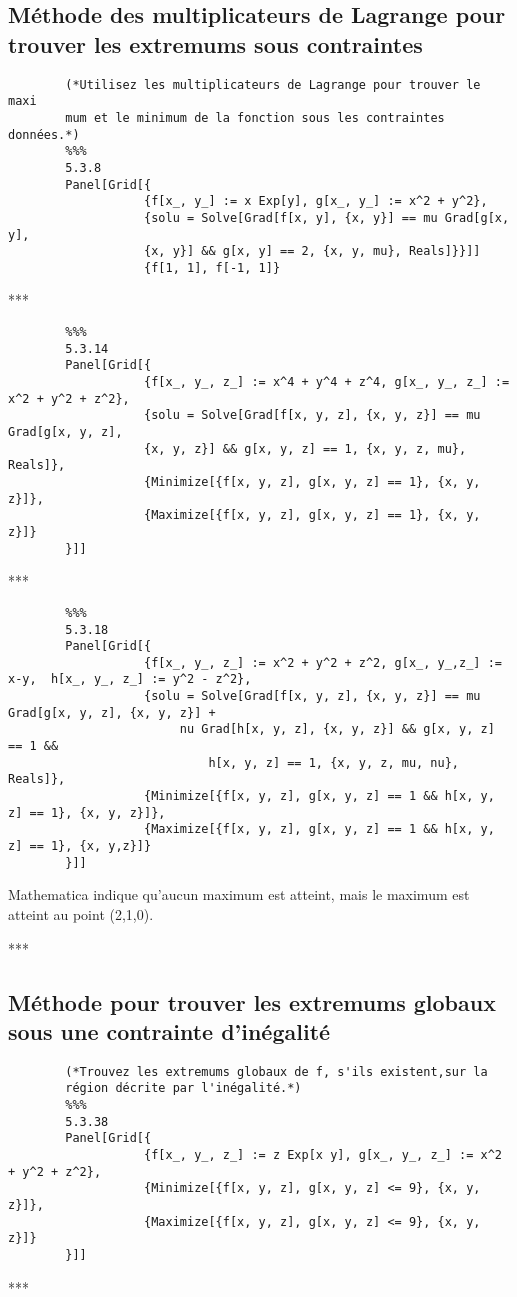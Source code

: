 \subsection{Méthode des multiplicateurs de Lagrange pour trouver les extremums sous contraintes}
		\begin{verbatim}
		(*Utilisez les multiplicateurs de Lagrange pour trouver le maxi­
		mum et le minimum de la fonction sous les contraintes données.*)
		%%%
		5.3.8
		Panel[Grid[{
		           {f[x_, y_] := x Exp[y], g[x_, y_] := x^2 + y^2},
		           {solu = Solve[Grad[f[x, y], {x, y}] == mu Grad[g[x, y], 
		           {x, y}] && g[x, y] == 2, {x, y, mu}, Reals]}}]]
		           {f[1, 1], f[-1, 1]}
	\end{verbatim}
	\begin{center}***\end{center}
	\begin{verbatim}
		%%%
		5.3.14
		Panel[Grid[{
		           {f[x_, y_, z_] := x^4 + y^4 + z^4, g[x_, y_, z_] := x^2 + y^2 + z^2},
		           {solu = Solve[Grad[f[x, y, z], {x, y, z}] == mu Grad[g[x, y, z], 
		           {x, y, z}] && g[x, y, z] == 1, {x, y, z, mu}, Reals]},
		           {Minimize[{f[x, y, z], g[x, y, z] == 1}, {x, y, z}]},
		           {Maximize[{f[x, y, z], g[x, y, z] == 1}, {x, y, z}]}
		}]]
	\end{verbatim}
	\begin{center}***\end{center}
	\begin{verbatim}
		%%%
		5.3.18
		Panel[Grid[{
		           {f[x_, y_, z_] := x^2 + y^2 + z^2, g[x_, y_,z_] := x-y,	h[x_, y_, z_] := y^2 - z^2},
		           {solu = Solve[Grad[f[x, y, z], {x, y, z}] == mu Grad[g[x, y, z], {x, y, z}] + 
		                nu Grad[h[x, y, z], {x, y, z}] && g[x, y, z] == 1 && 
		                    h[x, y, z] == 1, {x, y, z, mu, nu}, Reals]},
		           {Minimize[{f[x, y, z], g[x, y, z] == 1 && h[x, y, z] == 1}, {x, y, z}]},
		           {Maximize[{f[x, y, z], g[x, y, z] == 1 && h[x, y, z] == 1}, {x, y,z}]}
		}]]
	\end{verbatim}
	Mathematica indique qu'aucun maximum est atteint, mais le maximum est atteint au point (2,1,0).	
	\begin{center}***\end{center}

\subsection{Méthode pour trouver les extremums globaux sous une contrainte d'inégalité}
	\begin{verbatim}
		(*Trouvez les extremums globaux de f, s'ils existent,sur la
		région décrite par l'inégalité.*)
		%%%
		5.3.38
		Panel[Grid[{
		           {f[x_, y_, z_] := z Exp[x y], g[x_, y_, z_] := x^2 + y^2 + z^2},
		           {Minimize[{f[x, y, z], g[x, y, z] <= 9}, {x, y, z}]},
		           {Maximize[{f[x, y, z], g[x, y, z] <= 9}, {x, y, z}]}
		}]]
	\end{verbatim}
	\begin{center}***\end{center}
